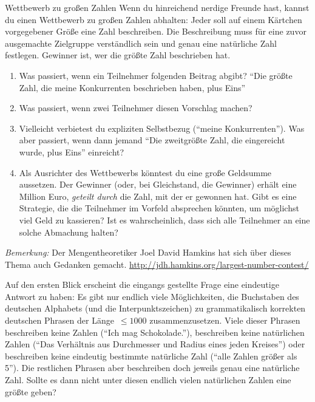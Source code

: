 \documentclass[twoside]{../zirkelblatt1415}
\theoremstyle{definition}
\theoremstyle{plain}
\theoremstyle{remark}
\begin{document}
\begin{aufgabe}{Wettbewerb zu großen Zahlen}
Wenn du hinreichend nerdige Freunde hast, kannst du einen Wettbewerb zu großen
Zahlen abhalten: Jeder soll auf einem Kärtchen vorgegebener Größe eine Zahl
beschreiben. Die Beschreibung muss für eine zuvor ausgemachte Zielgruppe
verständlich sein und genau eine natürliche Zahl festlegen. Gewinner ist, wer
die größte Zahl beschrieben hat.

\begin{enumerate}
\item Was passiert, wenn ein Teilnehmer folgenden Beitrag abgibt? "`Die größte
Zahl, die meine Konkurrenten beschrieben haben, plus Eins"'
\item Was passiert, wenn zwei Teilnehmer diesen Vorschlag machen?
\item Vielleicht verbietest du expliziten Selbstbezug ("`meine Konkurrenten"').
Was aber passiert, wenn dann jemand "`Die zweitgrößte Zahl, die eingereicht
wurde, plus Eins"' einreicht?
\item Als Ausrichter des Wettbewerbs könntest du eine große Geldsumme
aussetzen. Der Gewinner (oder, bei Gleichstand, die Gewinner) erhält eine
Million Euro, \emph{geteilt durch} die Zahl, mit der er gewonnen hat. Gibt es
eine Strategie, die die Teilnehmer im Vorfeld absprechen könnten, um möglichst
viel Geld zu kassieren? Ist es wahrscheinlich, dass sich alle Teilnehmer an
eine solche Abmachung halten?
\end{enumerate}

\emph{Bemerkung:} Der Mengentheoretiker Joel David Hamkins hat sich über dieses
Thema auch Gedanken gemacht.
\url{http://jdh.hamkins.org/largest-number-contest/}
\end{aufgabe}

Auf den ersten Blick erscheint die eingangs gestellte Frage eine
eindeutige Antwort zu haben: Es gibt nur endlich viele Möglichkeiten, die
Buchstaben des deutschen Alphabets (und die Interpunktszeichen) zu
grammatikalisch korrekten deutschen Phrasen der Länge~$\leq 1000$
zusammenzusetzen. Viele dieser Phrasen beschreiben keine Zahlen ("`Ich mag
Schokolade."'), beschreiben keine natürlichen Zahlen ("`Das Verhältnis aus
Durchmesser und Radius eines jeden Kreises"') oder beschreiben keine eindeutig
bestimmte natürliche Zahl ("`alle Zahlen größer als 5"'). Die restlichen
Phrasen aber beschreiben doch jeweils genau eine natürliche Zahl. Sollte es
dann nicht unter diesen endlich vielen natürlichen Zahlen eine größte geben?
\end{document}
